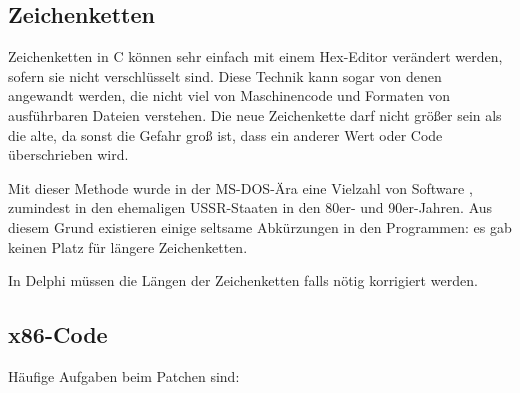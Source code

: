 
\subsection{Zeichenketten}

Zeichenketten in C können sehr einfach mit einem Hex-Editor verändert werden,
sofern sie nicht verschlüsselt sind.
Diese Technik kann sogar von denen angewandt werden, die nicht viel von Maschinencode
und Formaten von ausführbaren Dateien verstehen.
Die neue Zeichenkette darf nicht größer sein als die alte, da sonst die Gefahr
groß ist, dass ein anderer Wert oder Code überschrieben wird.

Mit dieser Methode wurde in der MS-DOS-Ära eine Vielzahl von Software ,
zumindest in den ehemaligen USSR-Staaten in den 80er- und 90er-Jahren.
Aus diesem Grund existieren einige seltsame Abkürzungen in den 
Programmen: es gab keinen Platz für längere Zeichenketten.


In Delphi müssen die Längen der Zeichenketten falls nötig korrigiert werden.

\subsection{x86-Code}
\label{x86_patching}

Häufige Aufgaben beim Patchen sind:

